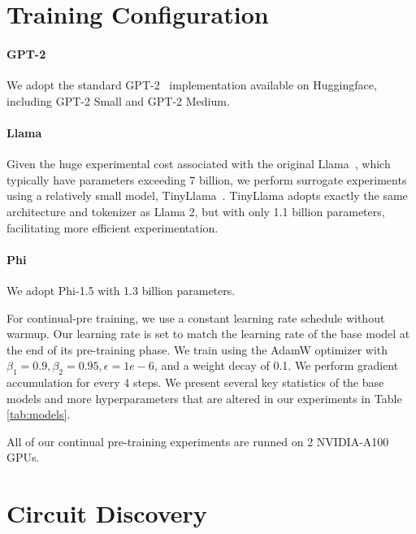 \section{Training Configuration}
\label{app:training}
\paragraph{GPT-2}
We adopt the standard GPT-2~\citep{gpt2} implementation available on Huggingface, including GPT-2 Small and GPT-2 Medium.

\paragraph{Llama}
Given the huge experimental cost associated with the original Llama~\citep{llama,llama2,llama3}, which typically have parameters exceeding 7 billion, we perform surrogate experiments using a relatively small model, TinyLlama~\citep{tinyllama}.
TinyLlama adopts exactly the same architecture and tokenizer as Llama 2, but with only 1.1 billion parameters, facilitating more efficient experimentation.

\paragraph{Phi}
We adopt Phi-1.5 \citep{phi-1.5} with 1.3 billion parameters.

For continual-pre training, we use a constant learning rate schedule without warmup.
Our learning rate is set to match the learning rate of the base model at the end of its pre-training phase.
We train using the AdamW optimizer with $\beta_1=0.9,\beta_2=0.95,\epsilon=1e-6$, and a
weight decay of 0.1.
We perform gradient accumulation for every 4 steps.
We present several key statistics of the base models and more hyperparameters that are altered in our experiments in Table \ref{tab:models}.


All of our continual pre-training experiments are runned on 2 NVIDIA-A100 GPUs. 

\section{Circuit Discovery}
\label{app:circuit_discovery}

\begin{table}
    \centering
    \caption{Templates for the factual recall task on relations.}
    \label{tab:templates}
    \vspace{-10pt}
\end{table}

